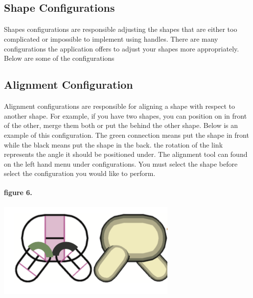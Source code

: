 \documentclass{report}
\begin{document}
\subsection*{Shape Configurations}

\paragraph{} Shapes configurations are responsible adjusting the shapes that are either too complicated or impossible to implement using handles. There are many configurations the application offers to adjust your shapes more appropriately. Below are some of the configurations

\subsection*{Alignment Configuration}

\paragraph{} Alignment configurations are responsible for aligning a shape with respect to another shape. For example, if you have two shapes, you can position on in front of the other, merge them both or put the behind the other shape. Below is an example of this configuration. The green connection means put the shape in front while the black means put the shape in the back. the rotation of the link represents the angle it should be positioned under. The alignment tool can found on the left hand menu under configurations. You must select the shape before select the configuration you would like to perform.

\paragraph{figure 6.}
\begin{center}
\includegraphics[width=\textwidth/2]{align_config.png}
\end{center}
\end{document}
